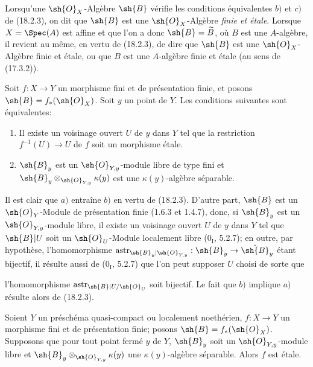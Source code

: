Lorsqu'une $\sh{O}_X$-Algèbre $\sh{B}$ vérifie les conditions équivalentes $b)$ et $c)$ de (18.2.3), on dit que $\sh{B}$ est une $\sh{O}_X$-Algèbre \emph{finie et étale}. Lorsque $X=\Spec(A)$ est affine et que l'on a donc $\sh{B}=\widetilde B$, où $B$ est une $A$-algèbre, il revient au même, en vertu de (18.2.3), de dire que $\sh{B}$ est une $\sh{O}_X$-Algèbre finie et étale, ou que $B$ est une $A$-algèbre finie et étale (au sens de (17.3.2)).

\begin{corollary}[18.2.4]
\label{IV.18.2.4}
Soit $f:X\to Y$ un morphisme fini et de présentation finie, et posons $\sh{B}=f_*(\sh{O}_X)$. Soit $y$ un point de $Y$. Les conditions suivantes sont équivalentes:
\begin{enumerate}
  \item[a)] Il existe un voisinage ouvert $U$ de $y$ dans $Y$ tel que la restriction $f^{-1}(U)\to U$ de $f$ soit un morphisme étale.
  \item[b)] $\sh{B}_y$ est un $\sh{O}_{Y,y}$-module libre de type fini et $\sh{B}_y\otimes_{\sh{O}_{Y,y}}\kappa(y)$ est une $\kappa(y)$-algèbre séparable.
\end{enumerate}
\end{corollary}

Il est clair que $a)$ entraîne $b)$ en vertu de (18.2.3). D'autre part, $\sh{B}$ est un $\sh{O}_Y$-Module de présentation finie (1.6.3 et 1.4.7), donc, si $\sh{B}_y$ est un $\sh{O}_{Y,y}$-module libre, il existe un voisinage ouvert $U$ de $y$ dans $Y$ tel que $\sh{B}|U$ soit un $\sh{O}_U$-Module localement libre ($0_{\mathrm I}$, 5.2.7); en outre, par hypothèse, l'homomorphisme $\operatorname{astr}_{\sh{B}_y|\sh{O}_{Y,y}}:\sh{B}_y\to\check{\sh{B}}_y$ étant bijectif, il résulte aussi de ($0_{\mathrm I}$, 5.2.7) que l'on peut supposer $U$ choisi de sorte que


l'homomorphisme $\operatorname{astr}_{\sh{B}|U/\sh{O}_U}$ soit bijectif. Le fait que $b)$ implique $a)$ résulte alors de (18.2.3).

\begin{corollary}[18.2.5]
\label{IV.18.2.5}
Soient $Y$ un préschéma quasi-compact ou localement noethérien, $f:X\to Y$ un morphisme fini et de présentation finie; posons $\sh{B}=f_*(\sh{O}_X)$. Supposons que pour tout point fermé $y$ de $Y$, $\sh{B}_y$ soit un $\sh{O}_{Y,y}$-module libre et $\sh{B}_y\otimes_{\sh{O}_{Y,y}}\kappa(y)$ une $\kappa(y)$-algèbre séparable. Alors $f$ est étale.
\end{corollary}

